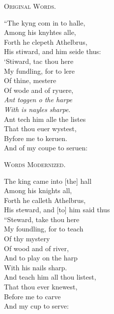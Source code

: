 \settowidth{\versewidth}{His steward, and [to] him said thus}
\begin{dcverse}
\vin\vin\textsc{Original Words.}

“The kyng com in to halle,\\
Among his knyhtes alle,\\
Forth he clepeth Athelbrus,\\
His stiward, and him seide thus:\\
‘Stiward, tac thou here\\
My fundling, for to lere\\
Of thine, mestere\\
Of wode and of ryuere,\\
\textit{Ant toggen o the harpe}\\
\textit{With is nayles sharpe}.\\
Ant tech him alle the listes\\
That thou euer wystest,\\
Byfore me to keruen.\\
And of my coupe to seruen:

\vin\vin\textsc{Words Modernized.}

The king came into [the] hall\\
Among his knights all,\\
Forth he calleth Athelbrus,\\
His steward, and [to] him said thus\\
“Steward, take thou here\\
My foundling, for to teach\\
Of thy mystery\\
Of wood and of river,\\
And to play on the harp\\
With his nails sharp.\\
And teach him all thou listest,\\
That thou ever knewest,\\
Before me to carve\\
And my cup to serve: 
\end{dcverse}

\pagebreak